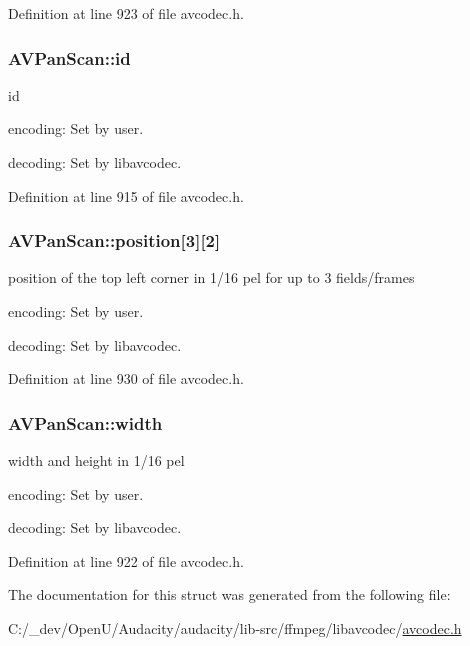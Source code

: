 Definition at line 923 of file avcodec.\+h.

\subsubsection[{\texorpdfstring{id}{id}}]{ A\+V\+Pan\+Scan\+::id}\hypertarget{struct_a_v_pan_scan_a34dfbcbb6c9582d0a10d9592a3d2eed2}{}\label{struct_a_v_pan_scan_a34dfbcbb6c9582d0a10d9592a3d2eed2}
id
\begin{DoxyItemize}
\item encoding\+: Set by user.
\item decoding\+: Set by libavcodec. 
\end{DoxyItemize}

Definition at line 915 of file avcodec.\+h.

\subsubsection[{\texorpdfstring{position}{position}}]{ A\+V\+Pan\+Scan\+::position\mbox{[}3\mbox{]}\mbox{[}2\mbox{]}}\hypertarget{struct_a_v_pan_scan_abfbf6d829276b4a73b97995827832eba}{}\label{struct_a_v_pan_scan_abfbf6d829276b4a73b97995827832eba}
position of the top left corner in 1/16 pel for up to 3 fields/frames
\begin{DoxyItemize}
\item encoding\+: Set by user.
\item decoding\+: Set by libavcodec. 
\end{DoxyItemize}

Definition at line 930 of file avcodec.\+h.

\subsubsection[{\texorpdfstring{width}{width}}]{ A\+V\+Pan\+Scan\+::width}\hypertarget{struct_a_v_pan_scan_a3963c714ee5ab0209f74de43bb2ef97b}{}\label{struct_a_v_pan_scan_a3963c714ee5ab0209f74de43bb2ef97b}
width and height in 1/16 pel
\begin{DoxyItemize}
\item encoding\+: Set by user.
\item decoding\+: Set by libavcodec. 
\end{DoxyItemize}

Definition at line 922 of file avcodec.\+h.



The documentation for this struct was generated from the following file\+:\begin{DoxyCompactItemize}
\item 
C\+:/\+\_\+dev/\+Open\+U/\+Audacity/audacity/lib-\/src/ffmpeg/libavcodec/\hyperlink{avcodec_8h}{avcodec.\+h}\end{DoxyCompactItemize}

